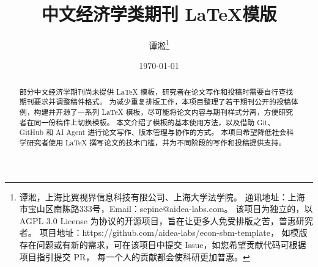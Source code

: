 \documentclass{aidealabs-paper-zh}
\title{中文经济学类期刊 \LaTeX 模版}
\author{
    谭淞\thanks{
        谭淞，上海比翼视界信息科技有限公司、上海大学法学院。
        通讯地址：上海市宝山区南陈路333号，Email：sepine@aidea-labs.com。
        该项目为独立的，以 AGPL 3.0 License 为协议的开源项目，旨在让更多人免受排版之苦，普惠研究者。
        项目地址：https://github.com/aidea-labs/econ-sbm-template，
        如模版存在问题或有新的需求，可在该项目中提交 Issue，如您希望贡献代码可根据项目指引提交 PR，
        每一个人的贡献都会使科研更加普惠。}
}
\date{\today}
\begin{document}
\maketitle

\begin{abstract}
    部分中文经济学期刊尚未提供 \LaTeX{} 模板，研究者在论文写作和投稿时需要自行查找期刊要求并调整稿件格式。
    为减少重复排版工作，本项目整理了若干期刊公开的投稿体例，构建并开源了一系列 \LaTeX{} 模板，尽可能将论文内容与期刊样式分离，方便研究者在同一份稿件上切换模板。
    本文介绍了模板的基本使用方法，以及借助 Git、GitHub 和 AI Agent 进行论文写作、版本管理与协作的方式。
    本项目希望降低社会科学研究者使用 \LaTeX{} 撰写论文的技术门槛，并为不同阶段的写作和投稿提供支持。

\end{abstract}







\newpage
\printbibliography[title={参考文献}]

\clearpage
\appendix

\end{document}
